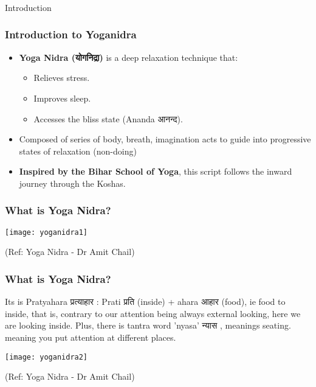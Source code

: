 \begin{frame}[fragile]\frametitle{}
\begin{center}
{\Large Introduction}
\end{center}
\end{frame}


\begin{frame}[fragile]\frametitle{Introduction to Yoganidra}
	\begin{itemize}
		\item \textbf{Yoga Nidra (योगनिद्रा)} is a deep relaxation technique that:
			\begin{itemize}
				\item Relieves stress.
				\item Improves sleep.
				\item Accesses the bliss state (Ananda आनन्द).
			\end{itemize}
	\item Composed of series of body, breath, imagination acts to guide into progressive states of relaxation (non-doing)
    \item \textbf{Inspired by the Bihar School of Yoga}, this script follows the inward journey through the Koshas.
	\end{itemize}
	
\end{frame}

\begin{frame}[fragile]\frametitle{What is Yoga Nidra?}
      \begin{center}
        \texttt{[image: yoganidra1]}

		{\tiny (Ref: Yoga Nidra - Dr Amit Chail)}		
        \end{center}

\end{frame}

\begin{frame}[fragile]\frametitle{What is Yoga Nidra?}
Its is Pratyahara प्रत्याहार  : Prati प्रति (inside) + ahara आहार  (food), ie food to inside, that is, contrary to our attention being always external looking, here we are looking inside. Plus, there is tantra word 'nyasa' न्यास , meanings seating. meaning you put attention at different places.

      \begin{center}
        \texttt{[image: yoganidra2]}

		{\tiny (Ref: Yoga Nidra - Dr Amit Chail)}		
        \end{center}

\end{frame}

